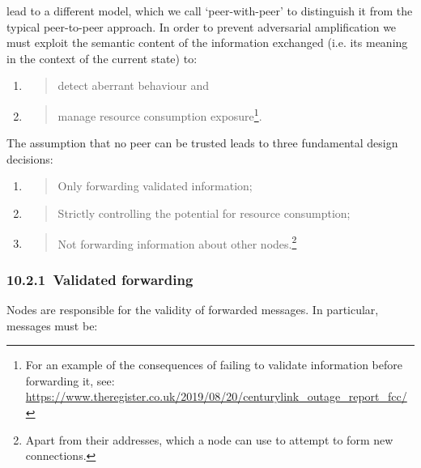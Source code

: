 \documentclass[11pt,a4paper]{article}
\begin{document}
lead to a different model, which we call `peer-with-peer' to distinguish
it from the typical peer-to-peer approach. In order to prevent
adversarial amplification we must exploit the semantic content of the
information exchanged (i.e. its meaning in the context of the current
state) to:

\begin{enumerate}
\def\labelenumi{\arabic{enumi}.}
\item
  \begin{quote}
  detect aberrant behaviour and
  \end{quote}
\item
  \begin{quote}
  manage resource consumption exposure\footnote{For an example of the
    consequences of failing to validate information before forwarding
    it, see:
    \href{https://www.theregister.co.uk/2019/08/20/centurylink_outage_report_fcc/}{{https://www.theregister.co.uk/2019/08/20/centurylink\_outage\_report\_fcc/}}}.
  \end{quote}
\end{enumerate}

The assumption that no peer can be trusted leads to three fundamental
design decisions:

\begin{enumerate}
\def\labelenumi{\arabic{enumi}.}
\item
  \begin{quote}
  Only forwarding validated information;
  \end{quote}
\item
  \begin{quote}
  Strictly controlling the potential for resource consumption;
  \end{quote}
\item
  \begin{quote}
  Not forwarding information about other nodes.\footnote{Apart from
    their addresses, which a node can use to attempt to form new
    connections.}
  \end{quote}
\end{enumerate}

\hypertarget{validated-forwarding}{%
\subsubsection{​10.2.1​~Validated
forwarding}\label{validated-forwarding}}

Nodes are responsible for the validity of forwarded messages. In
particular, messages must be:
\end{document}
